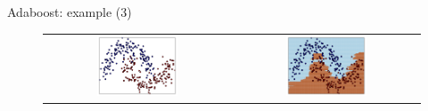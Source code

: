 \begin{frame}{Adaboost: example (3)}
\begin{figure}
\begin{tabular}{cc}
\includegraphics[width=0.45\textwidth]{img/boosting/3_data.pdf}&
\includegraphics[width=0.45\textwidth]{img/boosting/3_boundary.pdf}
\end{tabular}
\end{figure}
\end{frame}
